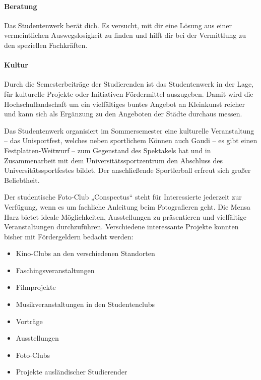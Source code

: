 \paragraph{Beratung}
Das Studentenwerk berät dich.
Es versucht, mit dir eine Lösung aus einer vermeintlichen Auswegslosigkeit zu finden und hilft dir bei der Vermittlung zu den speziellen Fachkräften.

\paragraph{Kultur}
Durch die Semesterbeiträge der Studierenden ist das Studentenwerk in der Lage, für kulturelle Projekte oder Initiativen Fördermittel auszugeben.
Damit wird die Hochschullandschaft um ein vielfältiges buntes Angebot an Kleinkunst reicher und kann sich als Ergänzung zu den Angeboten der Städte durchaus messen.

Das Studentenwerk organisiert im Sommersemester eine kulturelle Veranstaltung -- das Unisportfest, welches neben sportlichem Können auch Gaudi -- es gibt einen Festplatten-Weitwurf -- zum Gegenstand des Spektakels hat und in Zusammenarbeit mit dem Universitätssportzentrum den Abschluss des Universitätssportfestes bildet.
Der anschließende Sportlerball erfreut sich großer Beliebtheit.

Der studentische Foto-Club „Conspectus“ steht für Interessierte jederzeit zur Ver\-fügung, wenn es um fachliche Anleitung beim Fotografieren geht.
Die Mensa Harz bietet ideale Möglichkeiten, Ausstellungen zu präsentieren und vielfältige Veranstaltungen durchzuführen.
Verschiedene interessante Projekte konnten bisher mit Fördergeldern bedacht werden:

\begin{itemize}
    \item Kino-Clubs an den verschiedenen Standorten
    \item Faschingsveranstaltungen
    \item Filmprojekte
    \item Musikveranstaltungen in den Studentenclubs
    \item Vorträge
    \item Ausstellungen
    \item Foto-Clubs
    \item Projekte ausländischer Studierender
\end{itemize}

